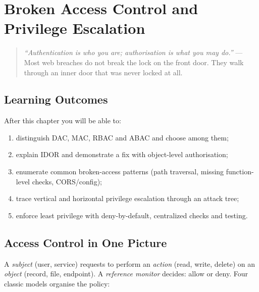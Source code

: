 \chapter{Broken Access Control and Privilege Escalation}\label{ch:access}
\setlength{\emergencystretch}{3em}

\begin{quote}
\emph{``Authentication is who you are; authorisation is what you may do.''} --- Most web breaches do not break the lock on the front door. They walk through an inner door that was never locked at all.
\end{quote}

\noindent{}
\vspace{0.4em}

\section*{Learning Outcomes}
After this chapter you will be able to:
\begin{enumerate}[label=(L\arabic*)]
    \item distinguish DAC, MAC, RBAC and ABAC and choose among them;
    \item explain IDOR and demonstrate a fix with object-level authorisation;
    \item enumerate common broken-access patterns (path traversal, missing function-level checks, CORS/config);
    \item trace vertical and horizontal privilege escalation through an attack tree;
    \item enforce least privilege with deny-by-default, centralized checks and testing.
\end{enumerate}

\section{Access Control in One Picture}\label{sec:models}
A \emph{subject} (user, service) requests to perform an \emph{action} (read, write, delete) on an \emph{object} (record, file, endpoint). A \emph{reference monitor} decides: allow or deny. Four classic models organise the policy:

